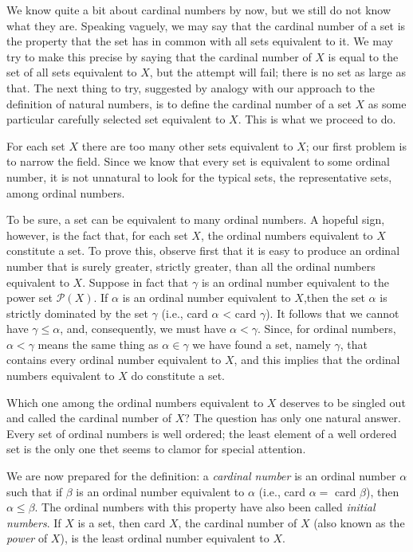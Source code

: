 

We know quite a bit about cardinal numbers by now, but we still do not know what they are. Speaking vaguely, we may say that the cardinal number of a set is the property that the set has in common with all sets equivalent to it. We may try to make this precise by saying that the cardinal number of $X$ is equal to the set of all sets equivalent to $X$, but the attempt will fail; there is no set as large as that. The next thing to try, suggested by analogy with our approach to the definition of natural numbers, is to define the cardinal number of a set $X$ as some particular carefully selected set equivalent to $X$. This is what we proceed to do. 

For each set $X$ there are too many other sets equivalent to $X$; our first problem is to narrow the field. Since we know that every set is equivalent to some ordinal number, it is not unnatural to look for the typical sets, the representative sets, among ordinal numbers. 

To be sure, a set can be equivalent to many ordinal numbers. A hopeful sign, however, is the fact that, for each set $X$, the ordinal numbers equivalent to $X$ constitute a set. To prove this, observe first that it is easy to produce an ordinal number that is surely greater, strictly greater, than all the ordinal numbers equivalent to $X$. Suppose in fact that $\gamma$ is an ordinal number equivalent to the power set $\mathcal{P}(X)$. If $\alpha$ is an ordinal number equivalent to $X$,then the set $\alpha$ is strictly dominated by the set $\gamma$ (i.e., card $\alpha$ < card $\gamma$). It follows that we cannot have $\gamma \le \alpha$, and, consequently, we must have $\alpha < \gamma$.  Since, for ordinal numbers, $\alpha < \gamma$ means the same thing as $\alpha \in \gamma$ we have found a set, namely $\gamma$, that contains every ordinal number equivalent to $X$, and this implies that the ordinal numbers equivalent to $X$ do constitute a set. 

Which one among the ordinal numbers equivalent to $X$ deserves to be singled out and called the cardinal number of $X$? The question has only one natural answer. Every set of ordinal numbers is well ordered; the least element of a well ordered set is the only one thet seems to clamor for special attention. 

We are now prepared for the definition: a \textit{cardinal number} is an ordinal number $\alpha$ such that if $\beta$ is an ordinal number equivalent to $\alpha$ (i.e., card $\alpha =$ card $\beta$), then $\alpha \le \beta$. The ordinal numbers with this property have also been called \textit{initial numbers}. If $X$ is a set, then card $X$, the cardinal number of $X$ (also known as the \textit{power} of $X$), is the least ordinal number equivalent to $X$. 

